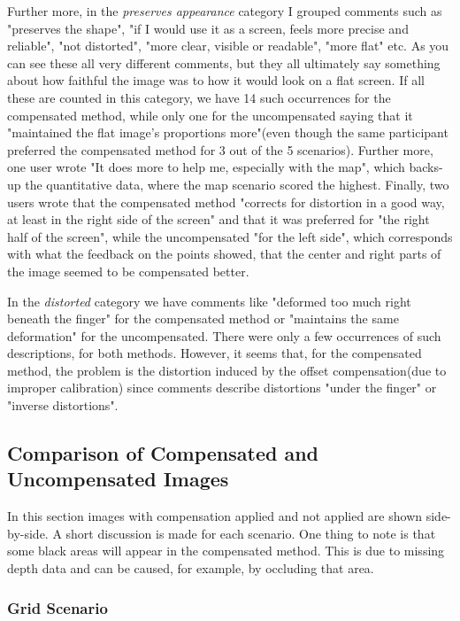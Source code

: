 \documentclass[]{article}
\begin{document}
Further more, in the \textit{preserves appearance} category I grouped comments such as "preserves the shape", "if I would use it as a screen, feels more precise and reliable", "not distorted", "more clear, visible or readable", "more flat" etc. As you can see these all very different comments, but they all ultimately say something about how faithful the image was to how it would look on a flat screen. If all these are counted in this category, we have 14 such occurrences for the compensated method, while only one for the uncompensated saying that it "maintained the flat image's proportions more"(even though the same participant preferred the compensated method for 3 out of the 5 scenarios). Further more, one user wrote "It does more to help me, especially with the map", which backs-up the quantitative data, where the map scenario scored the highest. Finally, two users wrote that the compensated method "corrects for distortion in a good way, at least in the right side of the screen" and that it was preferred for "the right half of the screen", while the uncompensated  "for the left side", which corresponds with what the feedback on the points showed, that the center and right parts of the image seemed to be compensated better. 


In the \textit{distorted} category we have comments like "deformed too much right beneath the finger" for the compensated method or "maintains the same deformation" for the uncompensated. There were only a few occurrences of such descriptions, for both methods. However, it seems that, for the compensated method, the problem is the distortion induced by the offset compensation(due to improper calibration) since comments describe distortions "under the finger" or "inverse distortions".

\clearpage
\subsection{Comparison of Compensated and Uncompensated Images}
\label{sec:comparison}
In this section images with compensation applied and not applied are shown side-by-side. A short discussion is made for each scenario. One thing to note is that some black areas will appear in the compensated method. This is due to missing depth data and can be caused, for example, by occluding that area.

\subsubsection{Grid Scenario}
\end{document}
